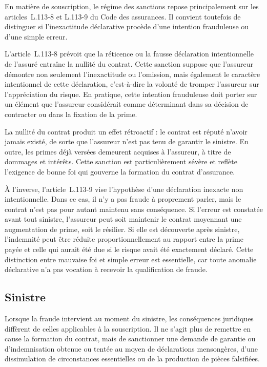 En matière de souscription, le régime des sanctions repose principalement sur les articles~L.113-8 et L.113-9 du Code des assurances. Il convient toutefois de distinguer si l'inexactitude déclarative procède d'une intention frauduleuse ou d'une simple erreur.

L'article~L.113-8 prévoit que la réticence ou la fausse déclaration intentionnelle de l'assuré entraîne la nullité du contrat. Cette sanction suppose que l'assureur démontre non seulement l'inexactitude ou l'omission, mais également le caractère intentionnel de cette déclaration, c'est-à-dire la volonté de tromper l'assureur sur l'appréciation du risque. En pratique, cette intention frauduleuse doit porter sur un élément que l'assureur considérait comme déterminant dans sa décision de contracter ou dans la fixation de la prime.

La nullité du contrat produit un effet rétroactif : le contrat est réputé n'avoir jamais existé, de sorte que l'assureur n'est pas tenu de garantir le sinistre. En outre, les primes déjà versées demeurent acquises à l'assureur, à titre de dommages et intérêts. Cette sanction est particulièrement sévère et reflète l'exigence de bonne foi qui gouverne la formation du contrat d'assurance.

À l'inverse, l'article~L.113-9 vise l'hypothèse d'une déclaration inexacte non intentionnelle. Dans ce cas, il n'y a pas fraude à proprement parler, mais le contrat n'est pas pour autant maintenu sans conséquence. Si l'erreur est constatée avant tout sinistre, l'assureur peut soit maintenir le contrat moyennant une augmentation de prime, soit le résilier. Si elle est découverte après sinistre, l'indemnité peut être réduite proportionnellement au rapport entre la prime payée et celle qui aurait été due si le risque avait été exactement déclaré. Cette distinction entre mauvaise foi et simple erreur est essentielle, car toute anomalie déclarative n'a pas vocation à recevoir la qualification de fraude.

\subsection{Sinistre}

Lorsque la fraude intervient au moment du sinistre, les conséquences juridiques diffèrent de celles applicables à la souscription. Il ne s'agit plus de remettre en cause la formation du contrat, mais de sanctionner une demande de garantie ou d'indemnisation obtenue ou tentée au moyen de déclarations mensongères, d'une dissimulation de circonstances essentielles ou de la production de pièces falsifiées.

